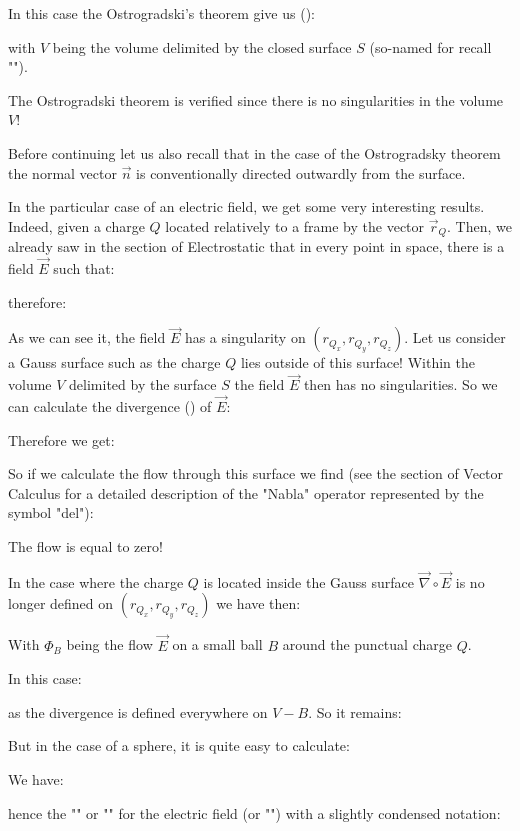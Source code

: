 	In this case the Ostrogradski's theorem give us ():
	
	with $V$ being the volume delimited by the closed surface $S$ (so-named for recall "").
	\begin{tcolorbox}[title=Remark,colframe=black,arc=10pt]
	The Ostrogradski theorem is verified since there is no singularities in the volume $V$!
	\end{tcolorbox}
	Before continuing let us also recall that in the case of the Ostrogradsky theorem the normal vector $\vec{n}$ is conventionally directed outwardly from the surface.
	
	In the particular case of an electric field, we get some very interesting results. Indeed, given a charge $Q$ located relatively to a frame by the vector $\vec{r}_Q$. Then, we already saw in the section of Electrostatic that in every point in space, there is a field $\vec{E}$ such that:
	
	therefore:
	
	As we can see it, the field $\vec{E}$ has a singularity on $(r_{Q_x},r_{Q_y},r_{Q_z})$. Let us consider a Gauss surface such as the charge $Q$ lies outside of this surface! Within the volume $V$ delimited by the surface $S$ the field $\vec{E}$ then has no singularities. So we can calculate the divergence () of $\vec{E}$:
	
	Therefore we get:
	
	So if we calculate the flow through this surface we find (see the section of Vector Calculus for a detailed description of the "Nabla" operator represented by the symbol "del"):
	
	The flow is equal to zero!
	
	In the case where the charge $Q$ is located inside the Gauss surface $\vec{\nabla}\circ\vec{E}$ is no longer defined on $(r_{Q_x},r_{Q_y},r_{Q_z})$ we have then:
	
	With $\Phi_B$ being the flow $\vec{E}$ on a small ball  $B$ around the punctual charge $Q$.
	
	In this case:
	
	as the divergence is defined everywhere on $V-B$. So it remains:
	
	But in the case of a sphere, it is quite easy to calculate:
	
	We have:
	
	hence the "" or "" for the electric field (or "") with a slightly condensed notation:
	
